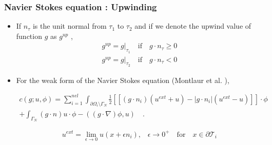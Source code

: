 \documentclass{beamer}
\begin{document}
\begin{frame}
\frametitle{Navier Stokes equation : Upwinding}
\begin{itemize}

\item If $n_\tau$ is the unit normal from $\tau_1$ to $\tau_2$ and if we denote the upwind value of function $g$ as $g^{up}$ \cite{riviere},
\begin{equation}
\begin{split}
g^{up} = g|_{\tau_1} \quad \textrm{if} \quad g \cdot n_\tau \geq 0 \\
g^{up} = g|_{\tau_2} \quad \textrm{if} \quad g \cdot n_\tau < 0
\end{split}
\end{equation}

\item For the weak form of the Navier Stokes equation (Montlaur et al. \cite{Montlaur}),

\begin{equation}
\begin{split}
c(g;u,\phi) = \sum_{i=1}^{nel} \int_{\partial \Omega_i \setminus \Gamma_N} \frac{1}{2} [[(g \cdot n_i)(u^{ext} + u) - |g \cdot n_i|(u^{ext} - u)]] \cdot \phi \\ + \int_{\Gamma_N} (g\cdot n) u \cdot \phi -((g\cdot \nabla)\phi,u) \quad \textrm{.}
\end{split}
\end{equation}

\begin{equation} \label{uext}
u^{ext} = \lim_{\epsilon \rightarrow 0} u(x+\epsilon n_i) \textrm{,} \quad \epsilon \to 0^+ \quad  \textrm{for} \quad x \in \partial \mathcal{T}_i
\end{equation}

\end{itemize}
\end{frame}


\end{document}
